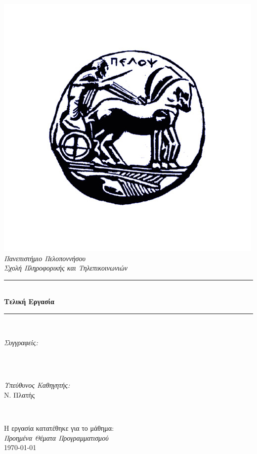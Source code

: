 \begin{titlepage}
    \newcommand{\HRule}{\rule{\linewidth}{0.5mm}}
    \center 
    \includegraphics[width=0.3\linewidth]{title/uop-logo.jpg}\\[0.5cm]
    \textsl{\Huge Πανεπιστήμιο Πελοποννήσου}\\[0.5cm] 
    \textsl{\Large Σχολή Πληροφορικής και Τηλεπικοινωνιών}\\[0.5cm] 
    \makeatletter
    \HRule \\[0.6cm]
    { \huge \bfseries Τελική Εργασία}\\[0.3cm] 
    \HRule \\[1cm]
    \large
    
    \begin{minipage}{0.45\textwidth}
    	\begin{flushleft}
            \emph{Συγγραφείς:}\\
            \@author \\
        \end{flushleft}
    \end{minipage}
    ~
    \begin{minipage}{0.45\textwidth}
    	\begin{flushright}
            \emph{Υπεύθυνος Καθηγητής:} \\
            \textup{Ν. Πλατής}
        \end{flushright}
    \end{minipage}\\[1cm]
    
    \makeatother
    
    {\large Η εργασία κατατέθηκε για το μάθημα:}\\[0.2cm]
    {\Large \emph{Προημένα Θέματα Προγραμματισμού}}\\[1cm]
    {\large \today}\\[2cm]
    \vfill 
\end{titlepage}